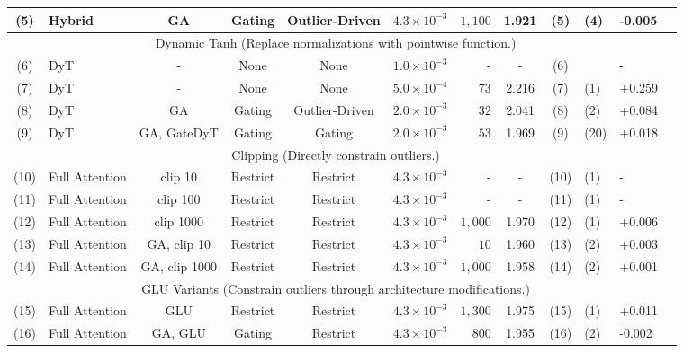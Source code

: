 \documentclass{article} %
\begin{document}
\begin{table}[t!]
{\begin{tabular}{clccccrccllc}
(5) & Hybrid & GA & Gating & Outlier-Driven & $4.3\times10^{-3}$ & \cellcolor{outlier5}$1,100$ & \cellcolor{loss7}1.921 & (5) & (4) & \cellcolor{gap_green2}-0.005 \\
\midrule
\multicolumn{11}{c}{Dynamic Tanh (Replace normalizations with pointwise function.)} \\
\midrule
(6) & DyT & - & None & None & $1.0\times10^{-3}$ & - & - & (6) &  & - \\
(7) &DyT & - & None & None & $5.0\times10^{-4}$ & \cellcolor{outlier2}$73$ & \cellcolor{loss1}2.216 & (7) & (1) & \cellcolor{gap_red3}+0.259 \\
(8) & DyT & GA & Gating & Outlier-Driven & $2.0\times10^{-3}$ & \cellcolor{outlier1}$32$ & \cellcolor{loss2}2.041 & (8) & (2) & \cellcolor{gap_red2}+0.084 \\
(9) & DyT & GA, GateDyT & Gating & Gating & $2.0\times10^{-3}$ & \cellcolor{outlier2}$53$ & \cellcolor{loss3}1.969 & (9) & (20) & \cellcolor{gap_red2}+0.018 \\
\midrule
\multicolumn{11}{c}{Clipping (Directly constrain outliers.)} \\
\midrule
(10) & Full Attention & clip 10 & Restrict & Restrict & $4.3\times10^{-3}$ & - & - & (10) & (1) & - \\
(11) & Full Attention & clip 100 & Restrict & Restrict & $4.3\times10^{-3}$ & - & - & (11) & (1) & - \\
(12) & Full Attention & clip 1000 & Restrict & Restrict & $4.3\times10^{-3}$ & \cellcolor{outlier5}$1,000$ & \cellcolor{loss5}1.970 & (12) & (1) & \cellcolor{gap_red1}+0.006 \\
(13) & Full Attention & GA, clip 10 & Restrict & Restrict & $4.3\times10^{-3}$ & \cellcolor{outlier1}$10$ & \cellcolor{loss5}1.960 & (13) & (2) & \cellcolor{gap_red1}+0.003 \\
(14) & Full Attention & GA, clip 1000 & Restrict & Restrict & $4.3\times10^{-3}$ & \cellcolor{outlier5}$1,000$ & \cellcolor{loss5}1.958 & (14) & (2) & \cellcolor{gap_red1}+0.001 \\
\midrule
\multicolumn{11}{c}{GLU Variants (Constrain outliers through architecture modifications.)} \\
\midrule
(15) & Full Attention & GLU & Restrict & Restrict & $4.3\times10^{-3}$ & \cellcolor{outlier5}$1,300$ & \cellcolor{loss5}1.975 & (15) & (1) & \cellcolor{gap_red1}+0.011 \\
(16) & Full Attention & GA, GLU & Gating & Restrict & $4.3\times10^{-3}$ & \cellcolor{outlier4}$800$ & \cellcolor{loss6}1.955 & (16) & (2) & \cellcolor{gap_green2}-0.002 \\

\end{tabular}}
\end{table}
\end{document}
